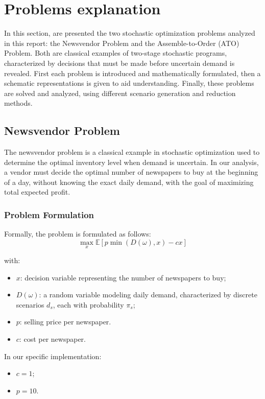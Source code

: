 \documentclass[a4paper,12pt]{article}
\begin{document}
	\section{Problems explanation}
	
	In this section, are presented the two stochastic optimization problems analyzed in this report: the Newsvendor Problem and the Assemble-to-Order (ATO) Problem. Both are classical examples of two-stage stochastic programs, characterized by decisions that must be made before uncertain demand is revealed. First each problem is introduced and mathematically formulated, then a schematic representations is given to aid understanding. Finally, these problems are solved and analyzed, using different scenario generation and reduction methods.
	
	\subsection{Newsvendor Problem}
	
	The newsvendor problem is a classical example in stochastic optimization used to determine the optimal inventory level when demand is uncertain. In our analysis, a vendor must decide the optimal number of newspapers to buy at the beginning of a day, without knowing the exact daily demand, with the goal of maximizing total expected profit.
	
	\subsubsection{Problem Formulation}
	
	Formally, the problem is formulated as follows:
	\[
	\max_{x} \mathbb{E}[p\min(D(\omega), x) - cx]
	\]
	
	with:
	\begin{itemize}
		\item \( x \): decision variable representing the number of newspapers to buy;
		\item \( D(\omega) \): a random variable modeling daily demand, characterized by discrete scenarios \( d_s \), each with probability \( \pi_s \);
		\item \( p \): selling price per newspaper.
		\item \( c \): cost per newspaper.
	\end{itemize}
	\vspace{0.20cm}

	In our specific implementation:
	
	\begin{itemize}
		\item \( c = 1 \);
		\item \( p = 10 \).
	\end{itemize}
	
\end{document}
